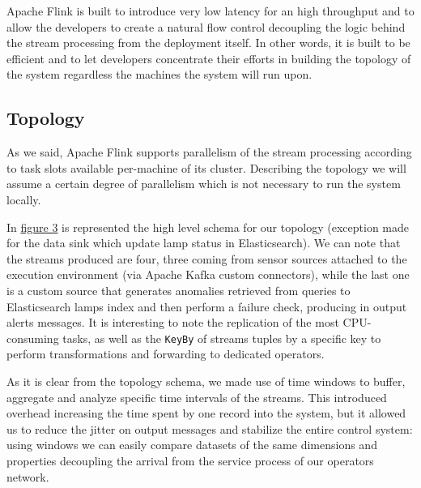 Apache Flink is built to introduce very low latency for an high throughput and to allow the developers to create a natural flow control decoupling the logic behind the stream processing from the deployment itself. In other words, it is built to be efficient and to let developers concentrate their efforts in building the topology of the system regardless the machines the system will run upon.

\subsection{Topology}
As we said, Apache Flink supports parallelism of the stream processing according to task slots available per-machine of its cluster. Describing the topology we will assume a certain degree of parallelism which is not necessary to run the system locally.

In \hyperref[fig:ember_topology]{figure 3} is represented the high level schema for our topology (exception made for the data sink which update lamp status in Elasticsearch). We can note that the streams produced are four, three coming from sensor sources attached to the execution environment (via Apache Kafka custom connectors), while the last one is a custom source that generates anomalies retrieved from queries to Elasticsearch lamps index and then perform a failure check, producing in output alerts messages.
It is interesting to note the replication of the most CPU-consuming tasks, as well as the \texttt{KeyBy} of streams tuples by a specific key to perform transformations and forwarding to dedicated operators.

As it is clear from the topology schema, we made use of time windows to buffer, aggregate and analyze specific time intervals of the streams. This introduced overhead increasing the time spent by one record into the system, but it allowed us to reduce the jitter on output messages and stabilize the entire control system: using windows we can easily compare datasets of the same dimensions and properties decoupling the arrival from the service process of our operators network.

